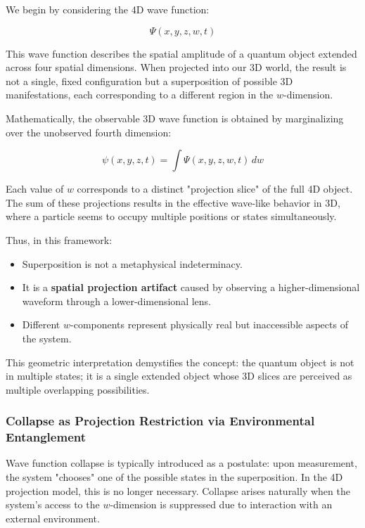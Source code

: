 \documentclass[12pt]{article}
\begin{document}
We begin by considering the 4D wave function:

\begin{equation}
\Psi(x, y, z, w, t)
\end{equation}

This wave function describes the spatial amplitude of a quantum object extended across four spatial dimensions. When projected into our 3D world, the result is not a single, fixed configuration but a superposition of possible 3D manifestations, each corresponding to a different region in the \( w \)-dimension.

Mathematically, the observable 3D wave function is obtained by marginalizing over the unobserved fourth dimension:

\begin{equation}
\psi(x, y, z, t) = \int \Psi(x, y, z, w, t) \, dw
\end{equation}

Each value of \( w \) corresponds to a distinct "projection slice" of the full 4D object. The sum of these projections results in the effective wave-like behavior in 3D, where a particle seems to occupy multiple positions or states simultaneously.

Thus, in this framework:

\begin{itemize}
  \item Superposition is not a metaphysical indeterminacy.
  \item It is a \textbf{spatial projection artifact} caused by observing a higher-dimensional waveform through a lower-dimensional lens.
  \item Different \( w \)-components represent physically real but inaccessible aspects of the system.
\end{itemize}

This geometric interpretation demystifies the concept: the quantum object is not in multiple states; it is a single extended object whose 3D slices are perceived as multiple overlapping possibilities.

\subsubsection{Collapse as Projection Restriction via Environmental Entanglement}

Wave function collapse is typically introduced as a postulate: upon measurement, the system "chooses" one of the possible states in the superposition. In the 4D projection model, this is no longer necessary. Collapse arises naturally when the system's access to the \( w \)-dimension is suppressed due to interaction with an external environment.
\end{document}
